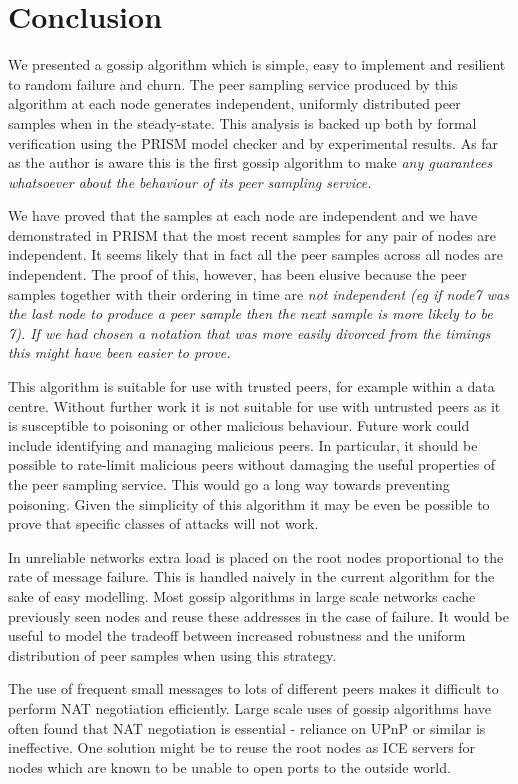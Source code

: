 \documentclass[a4paper,10pt]{article}
\begin{document}
\section{Conclusion}

We presented a gossip algorithm which is simple, easy to implement and resilient to random failure and churn. The peer sampling service produced by this algorithm at each node generates independent, uniformly distributed peer samples when in the steady-state. This analysis is backed up both by formal verification using the PRISM model checker and by experimental results. As far as the author is aware this is the first gossip algorithm to make \em any \em guarantees whatsoever about the behaviour of its peer sampling service.

We have proved that the samples at each node are independent and we have demonstrated in PRISM that the most recent samples for any pair of nodes are independent. It seems likely that in fact all the peer samples across all nodes are independent. The proof of this, however, has been elusive because the peer samples together with their ordering in time are \em not \em independent (eg if node7 was the last node to produce a peer sample then the next sample is more likely to be 7). If we had chosen a notation that was more easily divorced from the timings this might have been easier to prove.

This algorithm is suitable for use with trusted peers, for example within a data centre. Without further work it is not suitable for use with untrusted peers as it is susceptible to poisoning or other malicious behaviour. Future work could include identifying and managing malicious peers. In particular, it should be possible to rate-limit malicious peers without damaging the useful properties of the peer sampling service. This would go a long way towards preventing poisoning. Given the simplicity of this algorithm it may be even be possible to prove that specific classes of attacks will not work.

In unreliable networks extra load is placed on the root nodes proportional to the rate of message failure. This is handled naively in the current algorithm for the sake of easy modelling. Most gossip algorithms in large scale networks cache previously seen nodes and reuse these addresses in the case of failure. It would be useful to model the tradeoff between increased robustness and the uniform distribution of peer samples when using this strategy.

The use of frequent small messages to lots of different peers makes it difficult to perform NAT negotiation efficiently. Large scale uses of gossip algorithms have often found that NAT negotiation is essential \cite{arrg, tribler} - reliance on UPnP or similar is ineffective. One solution might be to reuse the root nodes as ICE servers for nodes which are known to be unable to open ports to the outside world.
\end{document}

